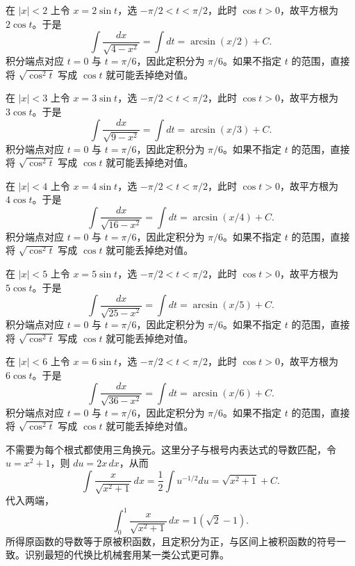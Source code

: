 \documentclass[12pt,fontset=fandol]{ctexart}
\begin{document}
\begin{solve}\label{ans:c14q14}
在 $|x|<2$ 上令 $x=2\sin t$，选 $-\pi/2<t<\pi/2$，此时 $\cos t>0$，故平方根为 $2\cos t$。于是
\[
\int\frac{dx}{\sqrt{4-x^2}}=\int dt=\arcsin(x/2)+C.
\]
积分端点对应 $t=0$ 与 $t=\pi/6$，因此定积分为 $\pi/6$。如果不指定 $t$ 的范围，直接将 $\sqrt{\cos^2t}$ 写成 $\cos t$ 就可能丢掉绝对值。
\end{solve}

\begin{solve}\label{ans:c14q15}
在 $|x|<3$ 上令 $x=3\sin t$，选 $-\pi/2<t<\pi/2$，此时 $\cos t>0$，故平方根为 $3\cos t$。于是
\[
\int\frac{dx}{\sqrt{9-x^2}}=\int dt=\arcsin(x/3)+C.
\]
积分端点对应 $t=0$ 与 $t=\pi/6$，因此定积分为 $\pi/6$。如果不指定 $t$ 的范围，直接将 $\sqrt{\cos^2t}$ 写成 $\cos t$ 就可能丢掉绝对值。
\end{solve}

\begin{solve}\label{ans:c14q16}
在 $|x|<4$ 上令 $x=4\sin t$，选 $-\pi/2<t<\pi/2$，此时 $\cos t>0$，故平方根为 $4\cos t$。于是
\[
\int\frac{dx}{\sqrt{16-x^2}}=\int dt=\arcsin(x/4)+C.
\]
积分端点对应 $t=0$ 与 $t=\pi/6$，因此定积分为 $\pi/6$。如果不指定 $t$ 的范围，直接将 $\sqrt{\cos^2t}$ 写成 $\cos t$ 就可能丢掉绝对值。
\end{solve}

\begin{solve}\label{ans:c14q17}
在 $|x|<5$ 上令 $x=5\sin t$，选 $-\pi/2<t<\pi/2$，此时 $\cos t>0$，故平方根为 $5\cos t$。于是
\[
\int\frac{dx}{\sqrt{25-x^2}}=\int dt=\arcsin(x/5)+C.
\]
积分端点对应 $t=0$ 与 $t=\pi/6$，因此定积分为 $\pi/6$。如果不指定 $t$ 的范围，直接将 $\sqrt{\cos^2t}$ 写成 $\cos t$ 就可能丢掉绝对值。
\end{solve}

\begin{solve}\label{ans:c14q18}
在 $|x|<6$ 上令 $x=6\sin t$，选 $-\pi/2<t<\pi/2$，此时 $\cos t>0$，故平方根为 $6\cos t$。于是
\[
\int\frac{dx}{\sqrt{36-x^2}}=\int dt=\arcsin(x/6)+C.
\]
积分端点对应 $t=0$ 与 $t=\pi/6$，因此定积分为 $\pi/6$。如果不指定 $t$ 的范围，直接将 $\sqrt{\cos^2t}$ 写成 $\cos t$ 就可能丢掉绝对值。
\end{solve}

\begin{solve}\label{ans:c14q19}
不需要为每个根式都使用三角换元。这里分子与根号内表达式的导数匹配，令 $u=x^2+1$，则 $du=2x\,dx$，从而
\[
\int\frac{x}{\sqrt{x^2+1}}\,dx=\frac12\int u^{-1/2}du=\sqrt{x^2+1}+C.
\]
代入两端，
\[
\int_0^{1}\frac{x}{\sqrt{x^2+1}}\,dx=1(\sqrt2-1).
\]
所得原函数的导数等于原被积函数，且定积分为正，与区间上被积函数的符号一致。识别最短的代换比机械套用某一类公式更可靠。
\end{solve}
\end{document}
